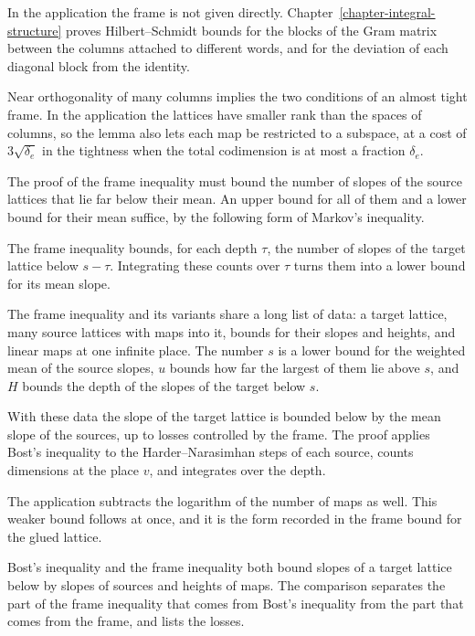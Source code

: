 In the application the frame is not given directly. Chapter~\ref{chapter-integral-structure}
proves Hilbert--Schmidt bounds for the blocks of the Gram matrix between the columns attached
to different words, and for the deviation of each diagonal block from the identity.

Near orthogonality of many columns implies the two conditions of an almost tight frame. In the
application the lattices have smaller rank than the spaces of columns, so the lemma also lets
each map be restricted to a subspace, at a cost of $3\sqrt{\delta_e}$ in the tightness when the
total codimension is at most a fraction $\delta_e$.

The proof of the frame inequality must bound the number of slopes of the source lattices that
lie far below their mean. An upper bound for all of them and a lower bound for their mean
suffice, by the following form of Markov's inequality.

The frame inequality bounds, for each depth $\tau$, the number of slopes of the target lattice
below $s-\tau$. Integrating these counts over $\tau$ turns them into a lower bound for its mean
slope.

The frame inequality and its variants share a long list of data: a target lattice, many source
lattices with maps into it, bounds for their slopes and heights, and linear maps at one infinite
place. The number $s$ is a lower bound for the weighted mean of the source slopes, $u$ bounds how
far the largest of them lie above $s$, and $H$ bounds the depth of the slopes of the target below
$s$.

With these data the slope of the target lattice is bounded below by the mean slope of the
sources, up to losses controlled by the frame. The proof applies Bost's inequality to the
Harder--Narasimhan steps of each source, counts dimensions at the place $v$, and integrates over
the depth.

The application subtracts the logarithm of the number of maps as well. This weaker bound follows
at once, and it is the form recorded in the frame bound for the glued lattice.

Bost's inequality and the frame inequality both bound slopes of a target lattice below by slopes
of sources and heights of maps. The comparison separates the part of the frame inequality that
comes from Bost's inequality from the part that comes from the frame, and lists the losses.

